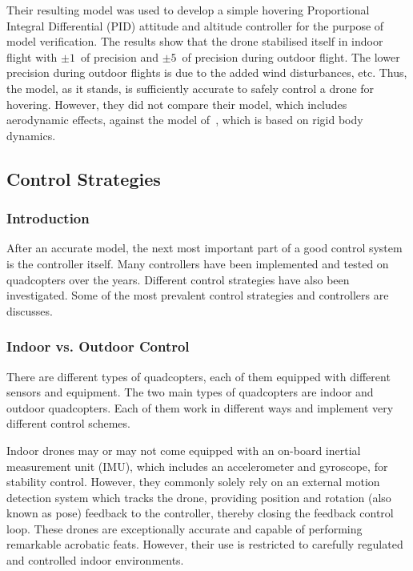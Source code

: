 Their resulting model was used to develop a simple hovering Proportional Integral Differential (PID) attitude and altitude controller for the purpose of model verification. The results show that the drone stabilised itself in indoor flight with $\pm1$\textdegree\ of precision and $\pm5$\textdegree\ of precision during outdoor flight. The lower precision during outdoor flights is due to the added wind disturbances, etc. Thus, the model, as it stands, is sufficiently accurate to safely control a drone for hovering. However, they did not compare their model, which includes aerodynamic effects, against the model of~\citeauthor{hamel2002dynamic}, which is based on rigid body dynamics. 

\subsection{Control Strategies}

\subsubsection{Introduction}

After an accurate model, the next most important part of a good control system is the controller itself. Many controllers have been implemented and tested on quadcopters over the years. Different control strategies have also been investigated. Some of the most prevalent control strategies and controllers are discusses.

\subsubsection{Indoor vs. Outdoor Control}

There are different types of quadcopters, each of them equipped with different sensors and equipment. The two main types of quadcopters are indoor and outdoor quadcopters. Each of them work in different ways and implement very different control schemes. 

Indoor drones may or may not come equipped with an on-board inertial measurement unit (IMU), which includes an accelerometer and gyroscope, for stability control. However, they commonly solely rely on an external motion detection system which tracks the drone, providing position and rotation (also known as pose) feedback to the controller, thereby closing the feedback control loop. These drones are exceptionally accurate and capable of performing remarkable acrobatic feats. However, their use is restricted to carefully regulated and controlled indoor environments.

